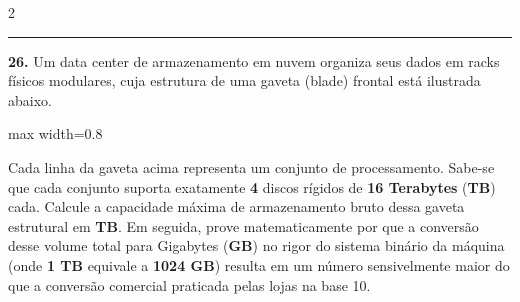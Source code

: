 \documentclass[twoside, 10pt, a4paper]{article}
\begin{document}
\begin{multicols*}{2}
\noindent\textcolor{CorLinha}{\rule{\linewidth}{0.5pt}} 
\par\par\vspace{0.5cm}
\textbf{26.} Um data center de armazenamento em nuvem organiza seus dados em racks físicos modulares, cuja estrutura de uma gaveta (blade) frontal está ilustrada abaixo.
\begin{center}
\begin{adjustbox}{max width=0.8\linewidth}
\end{adjustbox}
\end{center}

Cada linha da gaveta acima representa um conjunto de processamento. Sabe-se que cada conjunto suporta exatamente \textbf{4} discos rígidos de \textbf{16 Terabytes} (\textbf{TB}) cada. Calcule a capacidade máxima de armazenamento bruto dessa gaveta estrutural em \textbf{TB}. Em seguida, prove matematicamente por que a conversão desse volume total para Gigabytes (\textbf{GB}) no rigor do sistema binário da máquina (onde \textbf{1 TB} equivale a \textbf{1024 GB}) resulta em um número sensivelmente maior do que a conversão comercial praticada pelas lojas na base 10.
\par\vspace{0.5cm}


\end{multicols*}
\end{document}
